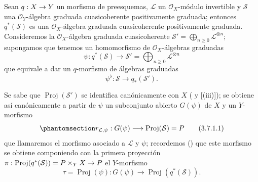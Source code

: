 \documentclass[oneside,10pt]{amsart}
\makeatletter
\renewcommand{\geq}{\geqslant}
\newcommand{\ega@arrow}[2]{\mathchoice{#1}{#2}{#2}{#2}}
\renewcommand{\to}{\ega@arrow{\longrightarrow}{\rightarrow}}
\newcommand{\oldpage}[2][]{\marginnote{\normalfont\footnotesize\textbf{#1}~|~#2}\ignorespaces}
\let\EGAOriginalLabel\label
\renewcommand{\label}[1]{\phantomsection\EGAOriginalLabel{#1}}
\makeatother
\begin{document}
\begin{env}[3.7.1]
\label{II.3.7.1-fr}
Sean $q:X\to Y$ un morfismo de preesquemas, $\mathcal{L}$ un $\mathcal{O}_X$-módulo invertible y $\mathcal{S}$ una $\mathcal{O}_Y$-álgebra graduada cuasicoherente positivamente graduada;
entonces $q^*(\mathcal{S})$ es una $\mathcal{O}_X$-álgebra graduada cuasicoherente positivamente graduada.
Consideremos la $\mathcal{O}_X$-álgebra graduada cuasicoherente $\mathcal{S}'=\bigoplus_{n\geq0}\mathcal{L}^{\otimes n}$;
supongamos que tenemos un homomorfismo de $\mathcal{O}_X$-álgebras graduadas
\[
  \psi:q^*(\mathcal{S})\longrightarrow
  \mathcal{S}'=\bigoplus_{n\geq0}\mathcal{L}^{\otimes n}
\]
que equivale a dar un $q$-morfismo de álgebras graduadas
\[
  \psi^\flat:\mathcal{S}\longrightarrow q_*(\mathcal{S}').
\]

Se sabe que $\operatorname{Proj}(\mathcal{S}')$ se identifica canónicamente con $X$ ( y [(iii)]);
se obtiene así canónicamente a partir de $\psi$ un subconjunto abierto $G(\psi)$ de $X$ y un $Y$-morfismo
\[
\label{II.3.7.1.1-fr}
  r_{\mathcal{L},\psi}:G(\psi)\longrightarrow
  \operatorname{Proj}(\mathcal{S})=P
\tag{3.7.1.1}
\]
\oldpage[II]{66}
que llamaremos el morfismo asociado a $\mathcal{L}$ y $\psi$;
recordemos () que este morfismo se obtiene componiendo con la primera proyección $\pi:\operatorname{Proj}(q^*(\mathcal{S}))=P\times_YX\to P$ el $Y$-morfismo
\[
  \tau=\operatorname{Proj}(\psi):G(\psi)\longrightarrow
  \operatorname{Proj}(q^*(\mathcal{S})).
\]

\end{env}
\end{document}
